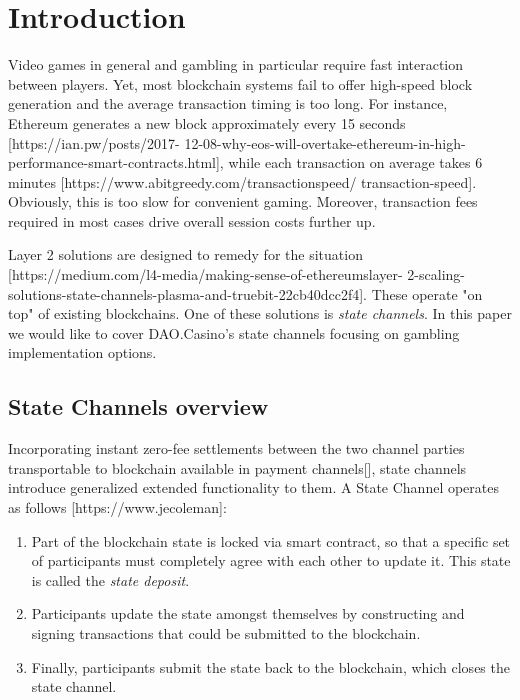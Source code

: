 \section{Introduction}
	Video games in general and gambling in particular require fast interaction between players. Yet, most blockchain systems fail to offer high-speed block generation and the average transaction timing is too long. For instance, Ethereum generates a new block approximately every 15 seconds [https://ian.pw/posts/2017-
12-08-why-eos-will-overtake-ethereum-in-high-performance-smart-contracts.html], while each transaction on average takes 6 minutes [https://www.abitgreedy.com/transactionspeed/                                                                                                                                            transaction-speed]. Obviously, this is too slow for convenient gaming. Moreover, transaction fees required in most cases drive overall session costs further up.


	Layer 2 solutions are designed to remedy for the situation [https://medium.com/l4-media/making-sense-of-ethereumslayer-
2-scaling-solutions-state-channels-plasma-and-truebit-22cb40dcc2f4]. These operate "on top" of existing blockchains. One of these solutions is \textit{state channels}. In this paper we would like to cover DAO.Casino's state channels focusing on gambling implementation options.


		\subsection {State Channels overview}
	Incorporating instant zero-fee settlements between the two channel parties transportable to blockchain available in payment channels[], state channels introduce generalized extended functionality to them. 
	A State Channel operates as follows [https://www.jecoleman]:
	\begin{enumerate}
		\item Part of the blockchain state is locked via smart contract, so that a specific set of participants must completely agree with each other to update it. This state is called the \textit {state deposit}.
		\item Participants update the state amongst themselves by constructing and signing transactions that could be submitted to the blockchain.
		\item Finally, participants submit the state back to the blockchain, which closes the state channel.
	\end{enumerate}

